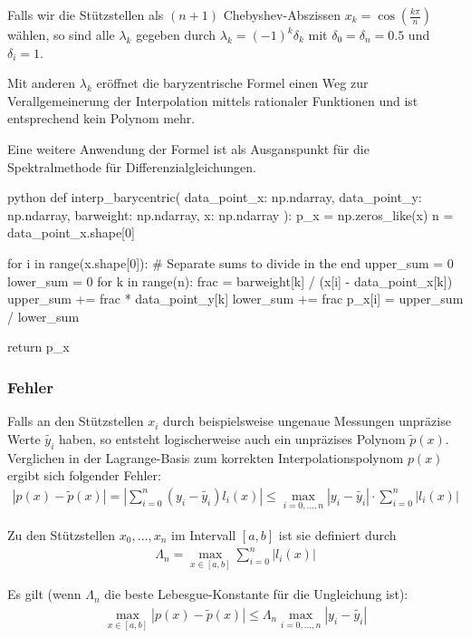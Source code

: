 Falls wir die Stützstellen als $(n + 1)$ Chebyshev-Abszissen $\displaystyle x_k = \cos\left( \frac{k\pi}{n} \right)$ wählen,
so sind alle $\lambda_k$ gegeben durch $\lambda_k = (-1)^k \delta_k$ mit $\delta_0 = \delta_n = 0.5$ und $\delta_i = 1$.

Mit anderen $\lambda_k$ eröffnet die baryzentrische Formel einen Weg zur Verallgemeinerung der Interpolation mittels rationaler Funktionen und ist entsprechend kein Polynom mehr.

Eine weitere Anwendung der Formel ist als Ausganspunkt für die Spektralmethode für Differenzialgleichungen.

\begin{code}{python}
    def interp_barycentric(
    data_point_x: np.ndarray,
    data_point_y: np.ndarray,
    barweight: np.ndarray,
    x: np.ndarray
    ):
    p_x = np.zeros_like(x)
    n = data_point_x.shape[0]

    for i in range(x.shape[0]):
    # Separate sums to divide in the end
    upper_sum = 0
    lower_sum = 0
    for k in range(n):
    frac = barweight[k] / (x[i] - data_point_x[k])
    upper_sum += frac * data_point_y[k]
    lower_sum += frac
    p_x[i] = upper_sum / lower_sum

    return p_x
\end{code}


\newpage
\subsubsection{Fehler}
Falls an den Stützstellen $x_i$ durch beispielsweise ungenaue Messungen unpräzise Werte $\tilde{y_i}$ haben, so entsteht logischerweise auch ein unpräzises Polynom $\tilde{p}(x)$.
Verglichen in der Lagrange-Basis zum korrekten Interpolationspolynom $p(x)$ ergibt sich folgender Fehler:
\begin{align*}
    |p(x) - \tilde{p}(x)| = \left| \sum_{i = 0}^{n} (y_i - \tilde{y_i}) l_i(x) \right| \leq \max_{i = 0, \ldots, n} |y_i - \tilde{y_i}| \cdot \sum_{i = 0}^{n} |l_i(x)|
\end{align*}


 Zu den Stützstellen $x_0, \ldots, x_n$ im Intervall $[a, b]$ ist sie definiert durch
\rmvspace
\begin{align*}
    \Lambda_n = \max_{x \in [a, b]} \sum_{i = 0}^{n} |l_i(x)|
\end{align*}


 Es gilt (wenn $\Lambda_n$ die beste Lebesgue-Konstante für die Ungleichung ist):
\rmvspace
\begin{align*}
    \max_{x \in [a, b]} |p(x) - \tilde{p}(x)| \leq \Lambda_n \max_{i = 0, \ldots, n} |y_i - \tilde{y_i}|
\end{align*}


